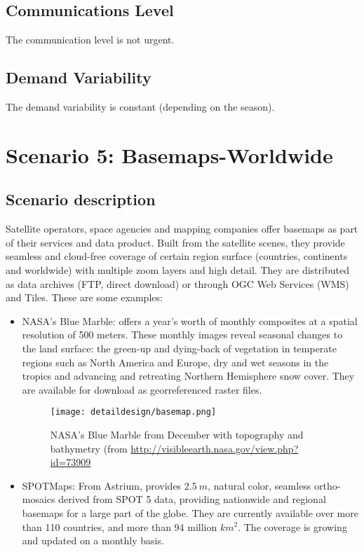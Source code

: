 \subsection{Communications Level}
The communication level is not urgent.
\subsection{Demand Variability}
The demand variability is constant (depending on the season).

\section{Scenario 5: Basemaps-Worldwide}
\subsection{Scenario description}
Satellite operators, space agencies and mapping companies offer basemaps as part of their services and data product. Built from the satellite scenes, they provide seamless and cloud-free coverage of certain region surface (countries, continents and worldwide) with multiple zoom layers and high detail. They are distributed as data archives (\ac{FTP}, direct download) or through OGC Web Services (\ac{WMS}) and Tiles. These are some examples:
\begin{itemize}
\item NASA's Blue Marble: offers a year's worth of monthly composites at a spatial resolution of 500 meters. These monthly images reveal seasonal changes to the land surface: the green-up and dying-back of vegetation in temperate regions such as North America and Europe, dry and wet seasons in the tropics and advancing and retreating Northern Hemisphere snow cover. They are available for download as georreferenced raster files. 

\begin{figure}[!h]
\begin{center}
\texttt{[image: detaildesign/basemap.png]}
\caption{NASA's Blue Marble from December with topography and bathymetry (from \url{http://visibleearth.nasa.gov/view.php?id=73909}}
\label{fig:basemap}
\end{center}
\end{figure}
\item SPOTMaps: From Astrium, provides $2.5~m$, natural color, seamless
  ortho-mosaics derived from SPOT 5 data, providing nationwide and regional
  basemaps for a large part of the globe. They are currently available over more
  than 110 countries, and more than 94 million $km^2$. The coverage is growing
  and updated on a monthly basis.
\end{itemize}


